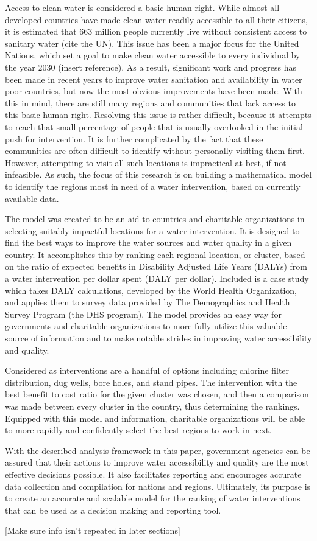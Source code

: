 Access to clean water is considered a basic human right.
While almost all developed countries have made clean water readily accessible to all their citizens, it is estimated that 663 million people currently live without consistent access to sanitary water (cite the UN).
This issue has been a major focus for the United Nations, which set a goal to make clean water accessible to every individual by the year 2030 (insert reference).
As a result, significant work and progress has been made in recent years to improve water sanitation and availability in water poor countries, but now the most obvious improvements have been made.
With this in mind, there are still many regions and communities that lack access to this basic human right.
Resolving this issue is rather difficult, because it attempts to reach that small percentage of people that is usually overlooked in the initial push for intervention.
It is further complicated by the fact that these communities are often difficult to identify without personally visiting them first.
However, attempting to visit all such locations is impractical at best, if not infeasible.
As such, the focus of this research is on building a mathematical model to identify the regions most in need of a water intervention, based on currently available data. 

The model was created to be an aid to countries and charitable organizations in selecting suitably impactful locations for a water intervention.
It is designed to find the best ways to improve the water sources and water quality in a given country.
It accomplishes this by ranking each regional location, or cluster, based on the ratio of expected benefits in Disability Adjusted Life Years (DALYs) from a water intervention per dollar spent (DALY per dollar).
Included is a case study which takes DALY calculations, developed by the World Health Organization, and applies them to survey data provided by The Demographics and Health Survey Program (the DHS program).
The model provides an easy way for governments and charitable organizations to more fully utilize this valuable source of information and to make notable strides in improving water accessibility and quality.

Considered as interventions are a handful of options including chlorine filter distribution, dug wells, bore holes, and stand pipes.
The intervention with the best benefit to cost ratio for the given cluster was chosen, and then a comparison was made between every cluster in the country, thus determining the rankings.
Equipped with this model and information, charitable organizations will be able to more rapidly and confidently select the best regions to work in next.

With the described analysis framework in this paper, government agencies can be assured that their actions to improve water accessibility and quality are the most effective decisions possible.
It also facilitates reporting and encourages accurate data collection and compilation for nations and regions.
Ultimately, its purpose is to create an accurate and scalable model for the ranking of water interventions that can be used as a decision making and reporting tool.

[Make sure info isn't repeated in later sections]